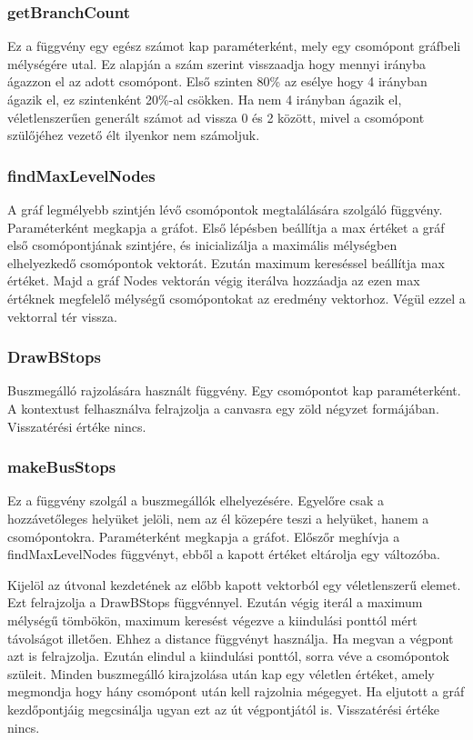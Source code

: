 \subsubsection{getBranchCount}
Ez a függvény egy egész számot kap paraméterként, mely egy csomópont gráfbeli mélységére utal. Ez alapján a szám szerint visszaadja hogy mennyi irányba ágazzon el az adott csomópont. Első szinten 80\% az esélye hogy 4 irányban ágazik el, ez szintenként 20\%-al csökken. Ha nem 4 irányban ágazik el, véletlenszerűen generált számot ad vissza 0 és 2 között, mivel a csomópont szülőjéhez vezető élt ilyenkor nem számoljuk.
\subsubsection{findMaxLevelNodes}
A gráf legmélyebb szintjén lévő csomópontok megtalálására szolgáló függvény. Paraméterként megkapja a gráfot. Első lépésben beállítja a max értéket a gráf első csomópontjának szintjére, és inicializálja a maximális mélységben elhelyezkedő csomópontok vektorát. Ezután maximum kereséssel beállítja max értéket. Majd a gráf Nodes vektorán végig iterálva hozzáadja az ezen max értéknek megfelelő mélységű csomópontokat az eredmény vektorhoz. Végül ezzel a vektorral tér vissza.
\subsubsection{DrawBStops}
Buszmegálló rajzolására használt függvény. Egy csomópontot kap paraméterként. A kontextust felhasználva felrajzolja a canvasra egy zöld négyzet formájában. Visszatérési értéke nincs.
\subsubsection{makeBusStops}
Ez a függvény szolgál a buszmegállók elhelyezésére. Egyelőre csak a hozzávetőleges helyüket jelöli, nem az él közepére teszi a helyüket, hanem a csomópontokra. Paraméterként megkapja a gráfot. Előszőr meghívja a findMaxLevelNodes függvényt, ebből a kapott értéket eltárolja egy változóba. 

Kijelöl az útvonal kezdetének az előbb kapott vektorból egy véletlenszerű elemet. Ezt felrajzolja a DrawBStops függvénnyel. Ezután végig iterál a maximum mélységű tömbökön, maximum keresést végezve a kiindulási ponttól mért távolságot illetően. Ehhez a distance függvényt használja. Ha megvan a végpont azt is felrajzolja. 
Ezután elindul a kiindulási ponttól, sorra véve a csomópontok szüleit. Minden buszmegálló kirajzolása után kap egy véletlen értéket, amely megmondja hogy hány csomópont után kell rajzolnia mégegyet. Ha eljutott a gráf kezdőpontjáig megcsinálja ugyan ezt az út végpontjától is. Visszatérési értéke nincs.
